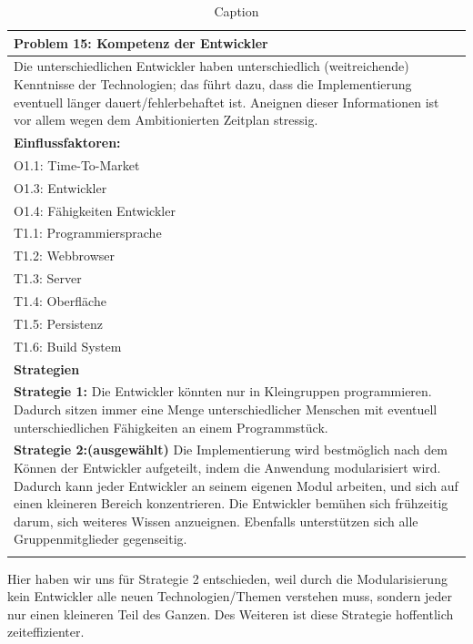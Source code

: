 \documentclass[enabledeprecatedfontcommands,fontsize=12pt,paper=a4,twoside]{scrartcl}
\begin{document}
\begin{table}[H]
    \centering
    \begin{tabular}{|p{15cm}|}
    \hline
          \textbf{Problem 15:} Kompetenz der Entwickler
          \\ \hline
          Die unterschiedlichen Entwickler haben unterschiedlich (weitreichende) Kenntnisse der Technologien; das führt dazu, dass die Implementierung eventuell länger dauert/fehlerbehaftet ist. Aneignen dieser Informationen ist vor allem wegen dem Ambitionierten Zeitplan stressig.
          \\ \hline
          \textbf{Einflussfaktoren: } \\
          O1.1: Time-To-Market \\
          O1.3: Entwickler \\
          O1.4: Fähigkeiten Entwickler \\
          T1.1: Programmiersprache \\
          T1.2: Webbrowser \\
          T1.3: Server \\
          T1.4: Oberfläche \\
          T1.5: Persistenz \\
          T1.6: Build System\\
          \hline
          \textbf{Strategien} \\ \hline
         \textbf{Strategie 1:} Die Entwickler könnten nur in Kleingruppen programmieren. Dadurch sitzen immer eine Menge unterschiedlicher Menschen mit eventuell unterschiedlichen Fähigkeiten an einem Programmstück. \\
          \textbf{Strategie 2:(ausgewählt)} Die Implementierung wird bestmöglich nach dem Können der Entwickler aufgeteilt, indem die Anwendung modularisiert wird. Dadurch kann jeder Entwickler an seinem eigenen Modul arbeiten, und sich auf einen kleineren Bereich konzentrieren. Die Entwickler bemühen sich frühzeitig darum, sich weiteres Wissen anzueignen. Ebenfalls unterstützen sich alle Gruppenmitglieder gegenseitig.\\
          \\ \hline
    \end{tabular}
    \caption{Caption}
    \label{tab:my_label}
\end{table}
Hier haben wir uns für Strategie 2 entschieden, weil durch die Modularisierung kein Entwickler alle neuen Technologien/Themen verstehen muss, sondern jeder nur einen kleineren Teil des Ganzen. Des Weiteren ist diese Strategie hoffentlich zeiteffizienter. \\
\end{document}
